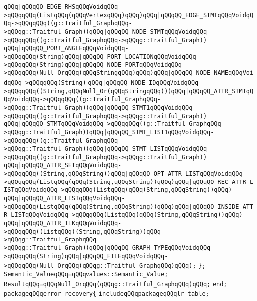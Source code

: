 \verb|qQQq|\verb#|qQQqQQ_EDGE_RHSqQQqVoidqQQq->qQQqqQQq(ListqQQq(qQQqVertexqQQq)qQQq)qQQq|qQQqQQ_EDGE_STMTqQQqVoidqQQq->qQQqqQQq((g::Traitful_GraphqQQq->qQQqg::Traitful_Graph))qQQq|qQQqQQ_NODE_STMTqQQqVoidqQQq->qQQqqQQq((g::Traitful_GraphqQQq->qQQqg::Traitful_Graph))#\newline
\verb|qQQq|\verb#|qQQqQQ_PORT_ANGLEqQQqVoidqQQq->qQQqqQQq(String)qQQq|qQQqQQ_PORT_LOCATIONqQQqVoidqQQq->qQQqqQQq(String)qQQq|qQQqQQ_NODE_PORTqQQqVoidqQQq->qQQqqQQq(Null_OrqQQq(qQQqStringqQQq)qQQq)qQQq|qQQqQQ_NODE_NAMEqQQqVoidqQQq->qQQqqQQq(String)#\newline
\verb|qQQq|\verb#|qQQqQQ_NODE_IDqQQqVoidqQQq->qQQqqQQq((String,qQQqNull_Or(qQQqStringqQQq)))qQQq|qQQqQQ_ATTR_STMTqQQqVoidqQQq->qQQqqQQq((g::Traitful_GraphqQQq->qQQqg::Traitful_Graph))qQQq|qQQqQQ_STMT1qQQqVoidqQQq->qQQqqQQq((g::Traitful_GraphqQQq->qQQqg::Traitful_Graph))#\newline
\verb|qQQq|\verb#|qQQqQQ_STMTqQQqVoidqQQq->qQQqqQQq((g::Traitful_GraphqQQq->qQQqg::Traitful_Graph))qQQq|qQQqQQ_STMT_LIST1qQQqVoidqQQq->qQQqqQQq((g::Traitful_GraphqQQq->qQQqg::Traitful_Graph))qQQq|qQQqQQ_STMT_LISTqQQqVoidqQQq->qQQqqQQq((g::Traitful_GraphqQQq->qQQqg::Traitful_Graph))#\newline
\verb|qQQq|\verb#|qQQqQQ_ATTR_SETqQQqVoidqQQq->qQQqqQQq((String,qQQqString))qQQq|qQQqQQ_OPT_ATTR_LISTqQQqVoidqQQq->qQQqqQQq(ListqQQq(qQQq(String,qQQqString))qQQq)qQQq|qQQqQQ_REC_ATTR_LISTqQQqVoidqQQq->qQQqqQQq(ListqQQq(qQQq(String,qQQqString))qQQq)#\newline
\verb|qQQq|\verb#|qQQqQQ_ATTR_LISTqQQqVoidqQQq->qQQqqQQq(ListqQQq(qQQq(String,qQQqString))qQQq)qQQq|qQQqQQ_INSIDE_ATTR_LISTqQQqVoidqQQq->qQQqqQQq(ListqQQq(qQQq(String,qQQqString))qQQq)#\newline
\verb|qQQq|\verb#|qQQqQQ_ATTR_ILKqQQqVoidqQQq->qQQqqQQq((ListqQQq((String,qQQqString))qQQq->qQQqg::Traitful_GraphqQQq->qQQqg::Traitful_Graph))qQQq|qQQqQQ_GRAPH_TYPEqQQqVoidqQQq->qQQqqQQq(String)qQQq|qQQqQQ_FILEqQQqVoidqQQq->qQQqqQQq(Null_OrqQQq(qQQqg::Traitful_GraphqQQq)qQQq);#\newline
\verb|};|\newline
\verb|Semantic_ValueqQQq=qQQqvalues::Semantic_Value;|\newline
\verb|ResultqQQq=qQQqNull_OrqQQq(qQQqg::Traitful_GraphqQQq)qQQq;|\newline
\verb|end;|\newline
\verb|packageqQQqerror_recovery{|\newline
\verb|includeqQQqpackageqQQqlr_table;|\newline
